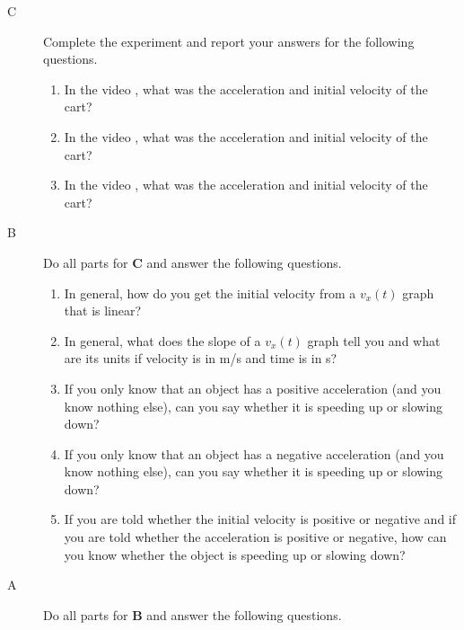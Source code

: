 \report

\begin{description}

\item[C]  Complete the experiment and report your answers for the following questions.

\begin{enumerate}
	 \item In the video , what was the acceleration and initial velocity of the cart?
	 \item In the video , what was the acceleration and initial velocity of the cart?
	 \item In the video , what was the acceleration and initial velocity of the cart?
\end{enumerate}

\item[B] Do all parts for {\bf C} and answer the following questions.

\begin{enumerate}
 \item In general, how do you get the initial velocity from a $v_x(t)$ graph that is linear?
 \item In general, what does the slope of a $v_x(t)$ graph tell you and what are its units if velocity is in m/s and time is in s?
 \item If you only know that an object has a positive acceleration (and you know nothing else), can you say whether it is speeding up or slowing down?
 \item If you only know that an object has a negative acceleration (and you know nothing else), can you say whether it is speeding up or slowing down?
 \item If you are told whether the initial velocity is positive or negative and if you are told whether the acceleration is positive or negative, how can you know whether the object is speeding up or slowing down?
\end{enumerate}

\item[A] Do all parts for {\bf B} and answer the following questions.


\end{description}
